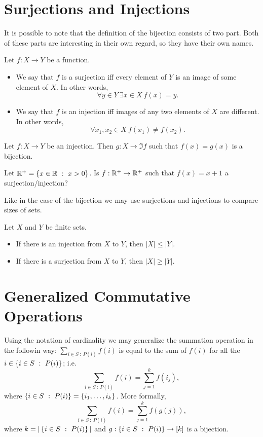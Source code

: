 \section{Surjections and Injections}

It is possible to note that the definition of the bijection consists of two part.
Both of these parts are interesting in their own regard, so they have their own
names.
\begin{definition}
  Let $f : X \to Y$ be a function.
  \begin{itemize}
    \item We say that $f$ is a surjection iff every element of $Y$ is an image
      of some element of $X$. In other words,
      $$
          \forall y \in Y~\exists x \in X\ f(x) = y.
      $$
    \item We say that $f$ is an injection iff images of any two elements
      of $X$ are different. In other words,
      $$
          \forall x_1, x_2 \in X\ f(x_1) \neq f(x_2).
      $$
  \end{itemize}
\end{definition}

\begin{remark}
  Let $f : X \to Y$ be an injection. Then $g : X \to \Im f$ such that
  $f(x) = g(x)$ is a bijection.
\end{remark}

\begin{exercise}
  Let $\R^+ = \set[x > 0]{x \in \R}$. Is $f : \mathbb{R}^+ \to \mathbb{R}^+$ such that
  $f(x) = x + 1$ a surjection/injection?
\end{exercise}

Like in the case of the bijection we may use surjections and injections to
compare sizes of sets.
\begin{theorem}
\label{theorem:injections-surjections-inequalities}
  Let $X$ and $Y$ be finite sets.
  \begin{itemize}
    \item If there is an injection from $X$ to $Y$, then $|X| \le |Y|$.
    \item If there is a surjection from $X$ to $Y$, then $|X| \ge |Y|$.
  \end{itemize}
\end{theorem}

\section{Generalized Commutative Operations}
Using the notation of cardinality we may generalize the summation operation in
the followin way: $\sum_{i \in S ~:~ P(i)} f(i)$ is equal to the sum of
$f(i)$ for all the $i \in \set[P(i)]{i \in S}$; i.e.
\[
  \sum_{i \in S ~:~ P(i)} f(i) = \sum_{j = 1}^k f(i_j),
\] where $\set[P(i)]{i \in S} = \set{i_1, \dots, i_k}$. More formally,
\[
  \sum_{i \in S ~:~ P(i)} f(i) = \sum_{j = 1}^k f(g(j)),
\]
where $k = |\set[P(i)]{i \in S}|$ and $g : \set[P(i)]{i \in S} \to [k]$ is a
bijection.


